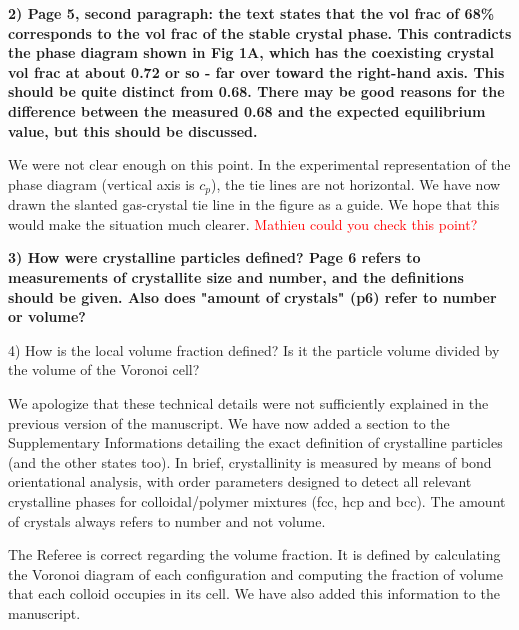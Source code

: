 \documentclass[11pt]{article}
\begin{document}
\vspace{1em}

\singlespacing

{\bf
2) Page 5, second paragraph: the text states that the vol frac of 68\% corresponds to the vol frac of the stable crystal phase. This contradicts the phase diagram shown in Fig 1A, which has the coexisting crystal vol frac at about 0.72 or so - far over toward the right-hand axis. This should be quite distinct from 0.68. There may be good reasons for the difference between the measured 0.68 and the expected equilibrium value, but this should be discussed.
}




\bigskip
\doublespacing

We were not clear enough on this point. In the experimental representation of the phase diagram (vertical axis is $c_p$), the tie lines are not horizontal. We have now drawn the slanted gas-crystal tie line in the figure as a guide. We hope that this would make the situation much clearer.
\textcolor{red}{Mathieu could you check this point?}


\vspace{1em}

\singlespacing

{\bf
3) How were crystalline particles defined? Page 6 refers to measurements of crystallite size and number, and the definitions should be given. Also does "amount of crystals" (p6) refer to number or volume?



4) How is the local volume fraction defined? Is it the particle volume divided by the volume of the Voronoi cell?
}


\bigskip
\doublespacing

We apologize that these technical details were not sufficiently explained in the previous version of the manuscript.
We have now added a section to the Supplementary Informations detailing the exact definition of crystalline particles
(and the other states too). In brief, crystallinity is measured by means of bond orientational analysis, with order
parameters designed to detect all relevant crystalline phases for colloidal/polymer mixtures (fcc, hcp and bcc).
The amount of crystals always refers to number and not volume.

The Referee is correct regarding the volume fraction. It is defined by calculating the Voronoi diagram of each configuration
and computing the fraction of volume that each colloid occupies in its cell. We have also added this information to
the manuscript.
\end{document}
